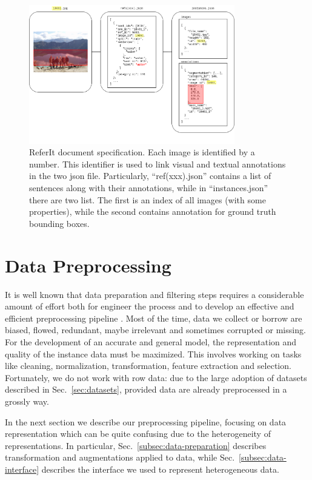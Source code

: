 \begin{figure}
  \centering
  \includegraphics[width=0.8\textwidth]{figures/referit-document-specification.png}
  \caption[ReferIt document specification]{ReferIt document
  specification. Each image is identified by a number. This identifier
  is used to link visual and textual annotations in the two json file.
  Particularly, ``ref(xxx).json'' contains a list of sentences along
  with their annotations, while in ``instances.json'' there are two
  list. The first is an index of all images (with some properties),
  while the second contains annotation for ground truth bounding
  boxes. }
  \label{fig:referit-technical-data-representation}
\end{figure}

\section{Data Preprocessing}
\label{sec:data-preprocessing}

It is well known that data preparation and filtering steps requires a
considerable amount of effort both for engineer the process and to
develop an effective and efficient preprocessing pipeline
\cite{kotsiantis2006data}. Most of the time, data we collect or borrow
are biased, flowed, redundant, maybe irrelevant and sometimes
corrupted or missing. For the development of an accurate and general
model, the representation and quality of the instance data must be
maximized. This involves working on tasks like cleaning,
normalization, transformation, feature extraction and selection.
Fortunately, we do not work with row data: due to the large adoption
of datasets described in Sec.~\ref{sec:datasets}, provided data are
already preprocessed in a grossly way.

In the next section we describe our preprocessing pipeline, focusing
on data representation which can be quite confusing due to the
heterogeneity of representations. In particular,
Sec.~\ref{subsec:data-preparation} describes transformation and
augmentations applied to data, while Sec.~\ref{subsec:data-interface}
describes the interface we used to represent heterogeneous data.

